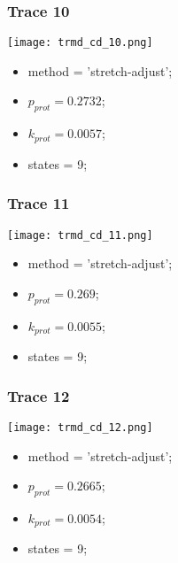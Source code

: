 \subsubsection{Trace 10}
\begin{minipage}[c]{0.7\textwidth}
	\texttt{[image: trmd\_cd\_10.png]}
\end{minipage}
\hfill
\begin{minipage}[c]{0.45\textwidth}
	\begin{itemize}
		\item method = 'stretch-adjust';
		\item $p_{prot}=0.2732$;
		\item $k_{prot}=0.0057$;
		\item states = 9;
	\end{itemize}
\end{minipage}

\subsubsection{Trace 11}
\begin{minipage}[c]{0.7\textwidth}
	\texttt{[image: trmd\_cd\_11.png]}
\end{minipage}
\hfill
\begin{minipage}[c]{0.45\textwidth}
	\begin{itemize}
		\item method = 'stretch-adjust';
		\item $p_{prot}=0.269$;
		\item $k_{prot}=0.0055$;
		\item states = 9;
	\end{itemize}
\end{minipage}

\subsubsection{Trace 12}
\begin{minipage}[c]{0.7\textwidth}
	\texttt{[image: trmd\_cd\_12.png]}
\end{minipage}
\hfill
\begin{minipage}[c]{0.45\textwidth}
	\begin{itemize}
		\item method = 'stretch-adjust';
		\item $p_{prot}=0.2665$;
		\item $k_{prot}=0.0054$;
		\item states = 9;
	\end{itemize}
\end{minipage}

